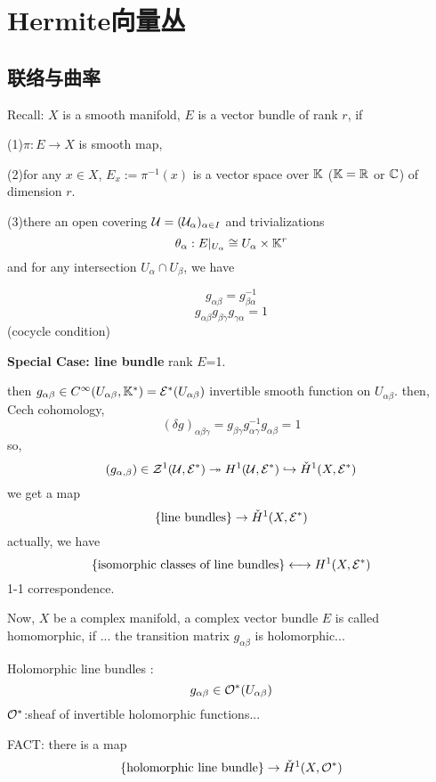 
\chapter{Hermite向量丛}
\section{联络与曲率}

Recall: $X$ is a smooth manifold, $E$ is a vector bundle of rank $r$, if

(1)$\pi:E\to X$ is smooth map,

(2)for any $x\in X$, $E_x:=\pi^{-1}(x)$ is a vector space over $\mathbb{K}$
($\mathbb{K}=\mathbb{R}$ or $\mathbb{C}$) of dimension $r$.

(3)there an open covering $\mathcal{U}=(\mathcal{U}_{\alpha})_{\alpha\in I}$ and trivializations
$$\theta_\alpha: E|_{U_{\alpha}}\cong U_{\alpha}\times \mathbb{K}^r$$
and for any intersection $U_{\alpha}\cap U_{\beta}$, we have

\begin{rem}
$$g_{\alpha\beta}=g_{\beta\alpha}^{-1}$$
$$g_{\alpha\beta}g_{\beta\gamma}g_{\gamma\alpha}=1$$
(cocycle condition)
\end{rem}

\textbf{Special Case: line bundle}
rank $E$=1.

then $g_{\alpha\beta}\in C^{\infty}(U_{\alpha\beta},\mathbb{K}^*)=\mathcal{E}^*(U_{\alpha\beta})$
invertible smooth function on $U_{\alpha\beta}$.
then, Cech cohomology,
$$(\delta g)_{\alpha\beta\gamma}=g_{\beta\gamma}g_{\alpha\gamma}^{-1}g_{\alpha\beta}=1$$
so,
$$(g_{\alpha,\beta})\in\mathcal{Z}^1(\mathcal{U},\mathcal{E}^*)
\twoheadrightarrow H^1(\mathcal{U},\mathcal{E}^*)\hookrightarrow\check{H}^1(X,\mathcal{E}^*)$$
we get a map
$$\{\text{line bundles}\}\to \check{H}^1(X,\mathcal{E}^*)$$
actually, we have
$$\{\text{isomorphic classes of line bundles}\}
\longleftrightarrow H^1(X,\mathcal{E}^*)$$
1-1 correspondence.

Now, $X$ be a complex manifold,
a complex vector bundle $E$ is called homomorphic,
if ... the transition matrix $g_{\alpha\beta}$ is holomorphic...

Holomorphic line bundles :
$$g_{\alpha\beta}\in\mathcal{O}^*(U_{\alpha\beta})$$
$\mathcal{O}^*$:sheaf of invertible holomorphic functions...

FACT: there is a map
$$\{\text{holomorphic line bundle}\}\to\check{H}^1(X,\mathcal{O}^*)$$

